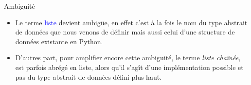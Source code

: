 \documentclass[10pt]{beamer}
\begin{document}
\begin{frame}{\Ctitle}{\stitle}
	\begin{block}{\textcolor{yellow}{\danger} \; Ambiguité}
		\begin{itemize}
			\item<1-> Le terme \textcolor{blue}{liste} devient ambigüe, en effet c'est à la fois le nom du type abstrait de données que nous venons de définir mais aussi celui d'une structure de données existante en Python.
			\item<2-> D'autres part, pour amplifier encore cette ambiguité, le terme \textit{liste chaînée}, est parfois abrégé en liste, alors qu'il s'agît d'une implémentation possible et pas du type abstrait de données défini plus haut.
		\end{itemize}
	\end{block}
\end{frame}
\end{document}
